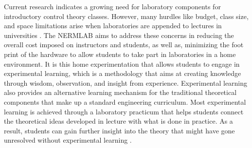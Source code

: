 



Current research indicates a growing need for laboratory components for introductory control theory classes. However, many hurdles like budget, class size, and space limitations arise when laboratories are appended to lectures in universities \citep{2,Experimential_Learning}. The \ac{NERMLAB} aims to address these concerns in reducing the overall cost imposed on instructors and students, as well as, minimizing the foot print of the hardware to allow students to take part in laboratories in a home environment. It is this home experimentation that allows students to engage in experimental learning, which is a methodology that aims at creating knowledge through wisdom, observation, and insight from experience. Experimental learning also provides an alternative learning mechanism for the traditional theoretical components that make up a standard engineering curriculum. Most experimental learning is achieved through a laboratory practicum that helps students connect the theoretical ideas developed in lecture with what is done in practice. As a result, students can gain further insight into the theory that might have gone unresolved without experimental learning \citep{Experimential_Learning}. 

